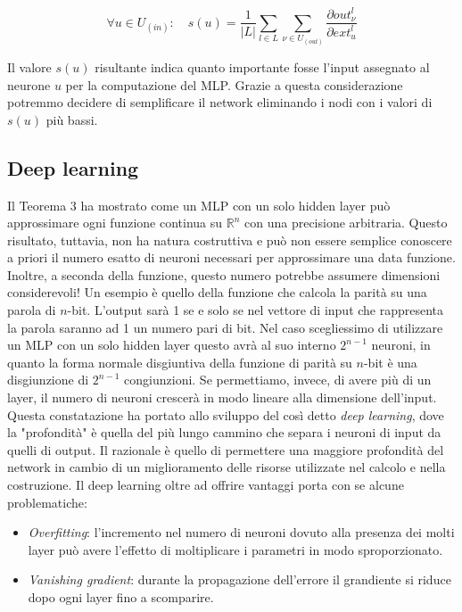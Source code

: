 \documentclass[10pt,a4paper]{article}
\begin{document}
$$
\forall u \in U_{(in)}: \quad s(u) = \frac{1}{|L|} \sum_{l \in L} \sum_{\nu \in U_{(out)}} \frac{\partial out_\nu^l}{\partial ext_u^l}
$$

Il valore $s(u)$ risultante indica quanto importante fosse l'input assegnato al neurone $u$ per la computazione del MLP. Grazie a questa considerazione potremmo decidere di semplificare il network eliminando i nodi con i valori di $s(u)$ più bassi.

\subsection{Deep learning}

Il Teorema 3 ha mostrato come un MLP con un solo hidden layer può approssimare ogni funzione continua su $\mathbb{R}^n$ con una precisione arbitraria. Questo risultato, tuttavia, non ha natura costruttiva e può non essere semplice conoscere a priori il numero esatto di neuroni necessari per approssimare una data funzione. Inoltre, a seconda della funzione, questo numero potrebbe assumere dimensioni considerevoli!
Un esempio è quello della funzione che calcola la parità su una parola di $n$-bit. L'output sarà 1 se e solo se nel vettore di input che rappresenta la parola saranno ad 1 un numero pari di bit. Nel caso scegliessimo di utilizzare un MLP con un solo hidden layer questo avrà al suo interno $2^{n-1}$ neuroni, in quanto la forma normale disgiuntiva della funzione di parità su $n$-bit è una disgiunzione di $2^{n-1}$ congiunzioni. 
Se permettiamo, invece, di avere più di un layer, il numero di neuroni crescerà in modo lineare alla dimensione dell'input. Questa constatazione ha portato allo sviluppo del così detto \emph{deep learning}, dove la "profondità" è quella del più lungo cammino che separa i neuroni di input da quelli di output. Il razionale è quello di permettere una maggiore profondità del network in cambio di un miglioramento delle risorse utilizzate nel calcolo e nella costruzione. Il deep learning oltre ad offrire vantaggi porta con se alcune problematiche:

\begin{itemize}
\item{\emph{Overfitting}: l'incremento nel numero di neuroni dovuto alla presenza dei molti layer può avere l'effetto di moltiplicare i parametri in modo sproporzionato.}
\item{\emph{Vanishing gradient}: durante la propagazione dell'errore il grandiente si riduce dopo ogni layer fino a scomparire.}
\end{itemize}
\end{document}
